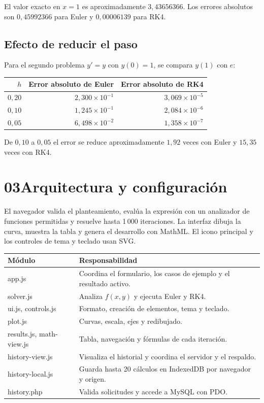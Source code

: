 \documentclass[11pt,a4paper]{article}
\newcommand{\topic}[2]{\section*{\sffamily\color{Navy}#1\enspace #2}\vspace{-.35em}}
\newcommand{\subtopic}[1]{\subsection*{\sffamily\color{Blue}#1}}
\begin{document}
El valor exacto en $x=1$ es aproximadamente $3{,}43656366$. Los errores absolutos son $0{,}45992366$ para Euler y $0{,}00006139$ para RK4.

\subtopic{Efecto de reducir el paso}
Para el segundo problema $y'=y$ con $y(0)=1$, se compara $y(1)$ con $e$:
\begin{center}
\begin{tabular}{@{}rrr@{}}
\toprule
 $h$ & Error absoluto de Euler & Error absoluto de RK4 \\
\midrule
 $0{,}20$ & $2{,}300\times10^{-1}$ & $3{,}069\times10^{-5}$ \\
 $0{,}10$ & $1{,}245\times10^{-1}$ & $2{,}084\times10^{-6}$ \\
 $0{,}05$ & $6{,}498\times10^{-2}$ & $1{,}358\times10^{-7}$ \\
\bottomrule
\end{tabular}
\end{center}
De $0{,}10$ a $0{,}05$ el error se reduce aproximadamente $1{,}92$ veces con Euler y $15{,}35$ veces con RK4.

\newpage
\topic{03}{Arquitectura y configuración}
El navegador valida el planteamiento, evalúa la expresión con un analizador de funciones permitidas y resuelve hasta 1\,000 iteraciones. La interfaz dibuja la curva, muestra la tabla y genera el desarrollo con MathML. El icono principal y los controles de tema y teclado usan SVG.

\begin{tabularx}{\linewidth}{@{}>{\ttfamily}l X@{}}
\toprule
 \normalfont\textbf{Módulo} & \textbf{Responsabilidad} \\
\midrule
 app.js & Coordina el formulario, los casos de ejemplo y el resultado activo. \\
 solver.js & Analiza $f(x,y)$ y ejecuta Euler y RK4. \\
 ui.js, controls.js & Formato, creación de elementos, tema y teclado. \\
 plot.js & Curvas, escala, ejes y redibujado. \\
 results.js, math-view.js & Tabla, navegación y fórmulas de cada iteración. \\
 history-view.js & Visualiza el historial y coordina el servidor y el respaldo. \\
 history-local.js & Guarda hasta 20 cálculos en IndexedDB por navegador y origen. \\
 history.php & Valida solicitudes y accede a MySQL con PDO. \\
\bottomrule
\end{tabularx}
\end{document}
